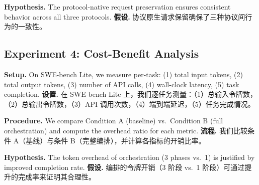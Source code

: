\textbf{Hypothesis.} The protocol-native request preservation ensures consistent behavior across all three protocols.
\textbf{假设.} 协议原生请求保留确保了三种协议间行为的一致性。

\subsection{Experiment 4: Cost-Benefit Analysis}

\textbf{Setup.} On SWE-bench Lite, we measure per-task: (1) total input tokens, (2) total output tokens, (3) number of API calls, (4) wall-clock latency, (5) task completion.
\textbf{设置.} 在 SWE-bench Lite 上，我们逐任务测量：（1）总输入令牌数，（2）总输出令牌数，（3）API 调用次数，（4）端到端延迟，（5）任务完成情况。

\textbf{Procedure.} We compare Condition A (baseline) vs.\ Condition B (full orchestration) and compute the overhead ratio for each metric.
\textbf{流程.} 我们比较条件 A（基线）与条件 B（完整编排），并计算各指标的开销比率。

\textbf{Hypothesis.} The token overhead of orchestration (3 phases vs.\ 1) is justified by improved completion rate.
\textbf{假设.} 编排的令牌开销（3 阶段 vs.\ 1 阶段）可通过提升的完成率来证明其合理性。
